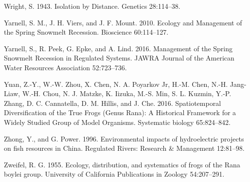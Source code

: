 \documentclass[proquest,12pt,final]{ucthesis-CA2012} %
\begin{document}
\begin{ucmainmatter}
\leavevmode\hypertarget{ref-wright_isolation_1943}{}%
Wright, S. 1943. Isolation by Distance. Genetics 28:114--38.

\leavevmode\hypertarget{ref-yarnell_ecology_2010}{}%
Yarnell, S. M., J. H. Viers, and J. F. Mount. 2010. Ecology and
Management of the Spring Snowmelt Recession. Bioscience 60:114--127.

\leavevmode\hypertarget{ref-yarnell_management_2016}{}%
Yarnell, S., R. Peek, G. Epke, and A. Lind. 2016. Management of the
Spring Snowmelt Recession in Regulated Systems. JAWRA Journal of the
American Water Resources Association 52:723--736.

\leavevmode\hypertarget{ref-yuan_spatiotemporal_2016}{}%
Yuan, Z.-Y., W.-W. Zhou, X. Chen, N. A. Poyarkov Jr, H.-M. Chen, N.-H.
Jang-Liaw, W.-H. Chou, N. J. Matzke, K. Iizuka, M.-S. Min, S. L. Kuzmin,
Y.-P. Zhang, D. C. Cannatella, D. M. Hillis, and J. Che. 2016.
Spatiotemporal Diversification of the True Frogs (Genus Rana): A
Historical Framework for a Widely Studied Group of Model Organisms.
Systematic biology 65:824--842.

\leavevmode\hypertarget{ref-zhong_environmental_1996}{}%
Zhong, Y., and G. Power. 1996. Environmental impacts of hydroelectric
projects on fish resources in China. Regulated Rivers: Research \&
Management 12:81--98.

\leavevmode\hypertarget{ref-zweifel_ecology_1955}{}%
Zweifel, R. G. 1955. Ecology, distribution, and systematics of frogs of
the Rana boylei group. University of California Publications in Zoology
54:207--291.

\end{ucmainmatter}
\end{document}
